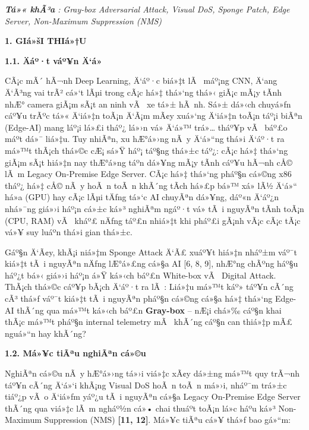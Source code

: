 \documentclass[]{article}
\begin{document}
\emph{\textbf{Tá»« khÃ³a} :} \emph{Gray-box Adversarial Attack, Visual
DoS, Sponge Patch, Edge Server, Non-Maximum Suppression (NMS)}

\textbf{1. GIá»šI THIá»†U}

\textbf{1.1. Äáº·t váº¥n Ä‘á»}

CÃ¡c mÃ´ hÃ¬nh Deep Learning, Ä‘áº·c biá»‡t lÃ  máº¡ng CNN, Ä‘ang Ä‘Ã³ng vai trÃ² cá»‘t 
lÃµi trong cÃ¡c há»‡ thá»‘ng thá»‹ giÃ¡c mÃ¡y tÃ­nh nhÆ° camera giÃ¡m sÃ¡t an ninh vÃ  
xe tá»± hÃ nh. Sá»± dá»‹ch chuyá»ƒn cáº¥u trÃºc tá»« Ä‘iá»‡n toÃ¡n Ä‘Ã¡m mÃ¢y xuá»‘ng Ä‘iá»‡n toÃ¡n 
táº¡i biÃªn (Edge-AI) mang láº¡i lá»£i tháº¿ lá»›n vá» Ä‘á»™ trá»… tháº¥p vÃ  báº£o máº­t dá»¯ liá»‡u. 
Tuy nhiÃªn, xu hÆ°á»›ng nÃ y Ä‘á»“ng thá»i Ä‘áº·t ra má»™t thÃ¡ch thá»©c cÆ¡ sá»Ÿ háº¡ táº§ng 
thá»±c táº¿: cÃ¡c há»‡ thá»‘ng giÃ¡m sÃ¡t hiá»‡n nay thÆ°á»ng táº­n dá»¥ng mÃ¡y tÃ­nh cáº¥u hÃ¬nh 
cÅ© lÃ m Legacy On-Premise Edge Server. CÃ¡c há»‡ thá»‘ng pháº§n cá»©ng x86
tháº¿ há»‡ cÅ© nÃ y hoÃ n toÃ n khÃ´ng tÃ­ch há»£p bá»™ xá»­ lÃ½ Ä‘á»“ há»a (GPU) hay cÃ¡c lÃµi
tÄƒng tá»‘c AI chuyÃªn dá»¥ng, dáº«n Ä‘áº¿n nhá»¯ng giá»›i háº¡n cá»±c ká»³ nghiÃªm ngáº·t vá»
tÃ i nguyÃªn tÃ­nh toÃ¡n (CPU, RAM) vÃ  kháº£ nÄƒng táº£n nhiá»‡t khi pháº£i gÃ¡nh vÃ¡c
cÃ¡c tÃ¡c vá»¥ suy luáº­n thá»i gian thá»±c.

Gáº§n Ä‘Ã¢y, khÃ¡i niá»‡m Sponge Attack Ä‘Ã£ xuáº¥t hiá»‡n nháº±m váº¯t kiá»‡t tÃ i nguyÃªn 
nÄƒng lÆ°á»£ng cá»§a AI {[}6, 8, 9{]}, nhÆ°ng chÃºng háº§u háº¿t bá»‹ giá»›i háº¡n á»Ÿ ká»‹ch 
báº£n White-box vÃ  Digital Attack. ThÃ¡ch thá»©c cáº¥p bÃ¡ch Ä‘áº·t ra lÃ : Liá»‡u
má»™t káº» táº¥n cÃ´ng cÃ³ thá»ƒ váº¯t kiá»‡t tÃ i nguyÃªn pháº§n cá»©ng cá»§a há»‡ thá»‘ng
Edge-AI thÃ´ng qua má»™t ká»‹ch báº£n \textbf{Gray-box} -- nÆ¡i chá»‰ cáº§n khai thÃ¡c 
má»™t pháº§n internal telemetry mÃ  khÃ´ng cáº§n can thiá»‡p mÃ£ nguá»“n hay khÃ´ng?

\textbf{1.2. Má»¥c tiÃªu nghiÃªn cá»©u}

NghiÃªn cá»©u nÃ y hÆ°á»›ng tá»›i viá»‡c xÃ¢y dá»±ng má»™t quy trÃ¬nh táº¥n cÃ´ng Ä‘á»‘i khÃ¡ng
Visual DoS hoÃ n toÃ n má»›i, nháº¯m trá»±c tiáº¿p vÃ o Ä‘iá»ƒm yáº¿u tÃ i nguyÃªn cá»§a
Legacy On-Premise Edge Server thÃ´ng qua viá»‡c lÃ m ngháº½n cá»• chai thuáº­t 
toÃ¡n lá»c háº­u ká»³ Non-Maximum Suppression (NMS) \textbf{{[}11, 12{]}}. 
Má»¥c tiÃªu cá»¥ thá»ƒ bao gá»“m:
\end{document}
